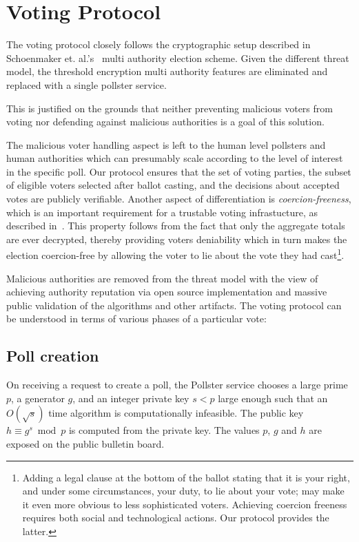 
\section{Voting Protocol}

The voting protocol closely follows the cryptographic
setup described in Schoenmaker et. al.'s~\cite{Cramer:1997:SOE:1754542.1754554}
multi authority election scheme.  Given the different threat model,
the threshold encryption multi authority features are eliminated
and replaced with a single pollster service.


This is justified on the grounds that neither preventing malicious voters from
voting nor defending against malicious authorities is a
goal of this solution.

The malicious voter handling aspect is left to the human level pollsters
and human authorities which can presumably scale according to the level
of interest in the specific poll.
Our protocol ensures that the set of voting parties, the subset of eligible
voters selected after ballot casting, and the decisions about
accepted votes are publicly verifiable.
Another aspect of differentiation is \emph{coercion-freeness}, which
is an important requirement for a trustable voting infrastucture,
as described in~\cite{Karlof:2005:CVP:1251398.1251401}.
This property follows from the fact that only the aggregate totals are ever
decrypted, thereby providing voters deniability which in turn makes the
election coercion-free by allowing the voter to lie about the vote
they had cast\footnote{Adding a legal clause at the bottom of the
  ballot stating that it is your right, and under some circumstances,
  your duty, to lie about your vote;
  may make it even more obvious to less sophisticated voters.  Achieving
  coercion freeness requires both social and technological actions.  Our protocol
  provides the latter.}.

Malicious authorities are removed from the threat model with the view
of achieving authority reputation via open source implementation and massive
public validation of the algorithms and other artifacts.
The voting protocol can be understood in terms of various phases of a
particular vote:

\subsection{Poll creation}
On receiving a request to create a poll, the Pollster service
chooses a large prime $p$, a generator $g$, and an integer private key $s < p$
large enough such that an $O(\sqrt s)$ time algorithm is computationally
infeasible.
The public key $h \equiv g^s\bmod p$ is computed from the private key.
The values $p$, $g$ and $h$
are exposed on the public bulletin board.

